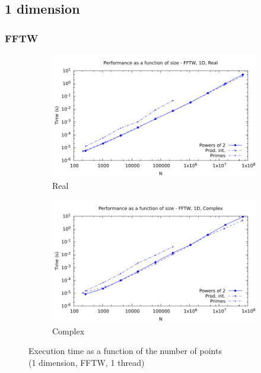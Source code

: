 \documentclass[12pt, a4paper]{article}
\begin{document}
\subsection{1 dimension}\label{1DS}
\subsubsection{FFTW}
\begin{figure}[H]
\captionsetup{width=0.8\linewidth}
\centering
\begin{subfigure}{.5\textwidth}
\centering
\includegraphics[width=.9\linewidth]{graphs/performance/1d-fftw-r.pdf}
\caption{Real}
\label{1DFFTWR}
\end{subfigure}%
\begin{subfigure}{.5\textwidth}
\centering
\includegraphics[width=.9\linewidth]{graphs/performance/1d-fftw-c.pdf}
\caption{Complex}
\label{1DFFTWC}
\end{subfigure}
\caption{Execution time as a function of the number of points\\(1 dimension, FFTW, 1 thread)}
\label{1DFFTW}
\end{figure}
\end{document}
